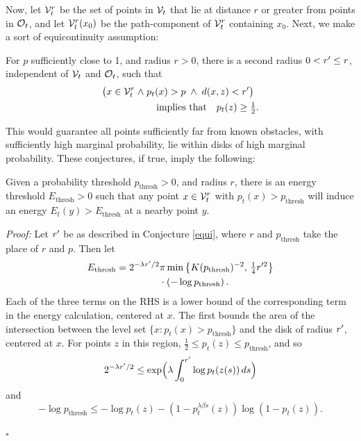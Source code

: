 \bigskip
Now, let $\mathcal{V}_t^r$ be the set of points in $\mathcal{V}_t$ that lie at distance $r$ or greater from points in $\mathcal{O}_t$, and let $\mathcal{V}_t^r(x_0)$ be the path-component of $\mathcal{V}_t^r$ containing $x_0$.  Next, we make a sort of equicontinuity assumption:
\begin{conj}
For $p$ sufficiently close to 1, and radius $r>0$, there is a second radius $0<r^{\prime}\leq r$, independent of $\mathcal{V}_t$ and $\mathcal{O}_t$,
such that 
\begin{align*}
\bigl(x\in\mathcal{V}_t^r \;\wedge\;&
p_t(x)>p \;\wedge\;
d(x,z)<r^{\prime}\bigr)\\
&\quad\text{implies that}\quad p_t(z)\geq\tfrac{1}{2}.
\end{align*}
\end{conj}
This would guarantee all points sufficiently far from known obstacles, with sufficiently high marginal probability, lie within disks of high marginal probability.  These conjectures, if true, imply the following:

\begin{lemma}
Given a probability threshold $p_{\text{thresh}}>0$, and radius $r$, there is an energy threshold $E_{\text{thresh}}>0$ such that any point $x\in\mathcal{V}_t^r$ with $p_t(x)>p_{\text{thresh}}$ will
induce an energy $E_t(y)>E_{\text{thresh}}$ at a nearby point $y$.
\end{lemma}
\emph{Proof:}
Let $r^{\prime}$ be as described in Conjecture \ref{equi}, where $r$ and $p_{\text{thresh}}$ take the place of $r$ and $p$.  Then let
\begin{align*}
E_{\text{thresh}} =  
2^{-\lambda r\1/2}&
\pi \min\left\{K(p_{\text{thresh}})^{-2},\,\tfrac{1}{4}r^{\prime 2}\right\}\\
&\cdot\left(-\log p_{\text{thresh}}\right).%
\end{align*}
Each of the three terms on the RHS is a lower bound of the corresponding term in the energy calculation, centered at $x$.  The first bounds the area of the intersection 
between the level set $\{x:p_t(x)>p_{\text{thresh}}\}$ 
and the disk of radius $r^{\prime}$, centered at $x$.
For points $z$ in this region, $\frac{1}{2} \leq p_t(z) \leq p_{\text{thresh}}$, and so
$$2^{-\lambda r^{\prime}/2}\leq\exp\Bigl(\lambda\int_0^{r^{\prime}} \log p_t(z(s))\,ds\Bigr)$$
and
$$-\log p_{\text{thresh}}\leq-\log p_t(z) -(1-p_t^{\lambda\beta s}(z)) \log (1-p_t(z)).$$
\begin{flushright}
{$\square$}
\end{flushright}

